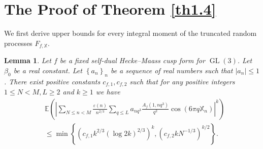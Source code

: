 \documentclass[10pt,leqno]{amsart}
\numberwithin{equation}{section}
\newtheorem{lemma}[definition]{{Lemma}}
\begin{document}
\section{The Proof of Theorem \ref{th1.4}}
We first derive upper bounds for every integral moment of the truncated random processes \( F_{f,\mathbb{X}} \).
\begin{lemma}\label{le6.1}
    Let $f$ be a fixed self-dual Hecke--Maass cusp form for $\operatorname{GL}(3)$. Let $\beta_0$ be a real constant. Let $\left\{a_n\right\}_n$ be a sequence of real numbers such that $\left|a_n\right| \leqslant 1$. There exist positive constants $c_{f,1}, c_{f,2}$ such that for any positive integers $1 \leqslant N<M, L \geqslant 2$ and $k \geqslant 1$ we have
    \begin{equation}\label{eq6.1}
    \begin{aligned}
        & \mathbb{E}\left(\left|\sum_{N \leqslant n<M} \frac{\varepsilon(n)}{n^{2 / 3}} \sum_{q \leqslant L} a_{n q^3} \frac{A_f\left(1,n q^3\right)}{q^{2}} \cos \left(6 \pi q \mathbb{X}_n\right)\right|^k\right) \\
        & \leqslant \min \left\{\left(c_{f,1} k^{2 / 3}\left(\log 2k\right)^{2/3}\right)^k,\left(c_{f,2} kN^{-1/3}\right)^{k / 2}\right\}.
    \end{aligned}
    \end{equation}
\end{lemma} 
\end{document}
